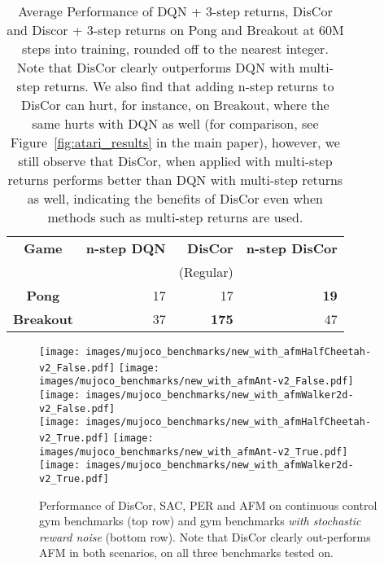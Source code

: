 \documentclass[jmlr]{article}
\begin{document}
\begin{table}[t]
\centering
\label{table:atari_multistep}
\begin{tabular}{c r r r}
\hline
\textbf{Game} & \textbf{n-step DQN} & \textbf{DisCor} & \textbf{n-step DisCor}\\
 &  & (Regular) &  \\
\hline
\hline
\textbf{Pong} & 17 & {17} & \colorbox{blue!30}{\textbf{19}} \\
\textbf{Breakout} & 37 & \textbf{175} & \colorbox{blue!30}{47} \\
\hline
\end{tabular}
\caption{\footnotesize{Average Performance of DQN + 3-step returns, DisCor and Discor + 3-step returns on Pong and Breakout at 60M steps into training, rounded off to the nearest integer. Note that DisCor clearly outperforms DQN with multi-step returns. We also find that adding n-step returns to DisCor can hurt, for instance, on Breakout, where the same hurts with DQN as well (for comparison, see Figure~\ref{fig:atari_results} in the main paper), however, we still observe that DisCor, when applied with multi-step returns performs better than DQN with multi-step returns as well, indicating the benefits of DisCor even when methods such as multi-step returns are used.}} 
\label{table:dqn_discor_nstep}
\end{table}

\begin{figure}[H]
    \centering
        \texttt{[image: images/mujoco\_benchmarks/new\_with\_afmHalfCheetah-v2\_False.pdf]}
        \texttt{[image: images/mujoco\_benchmarks/new\_with\_afmAnt-v2\_False.pdf]}
        \texttt{[image: images/mujoco\_benchmarks/new\_with\_afmWalker2d-v2\_False.pdf]}\\
        \vspace{4pt}
        \texttt{[image: images/mujoco\_benchmarks/new\_with\_afmHalfCheetah-v2\_True.pdf]}
        \texttt{[image: images/mujoco\_benchmarks/new\_with\_afmAnt-v2\_True.pdf]}
        \texttt{[image: images/mujoco\_benchmarks/new\_with\_afmWalker2d-v2\_True.pdf]}
    \caption{\footnotesize{Performance of DisCor, SAC, PER and AFM on continuous control gym benchmarks (top row) and gym benchmarks \textit{with stochastic reward noise} (bottom row). Note that DisCor clearly out-performs AFM in both scenarios, on all three benchmarks tested on.}}
    \label{fig:app_discor_vs_afm}
\end{figure}
\end{document}
